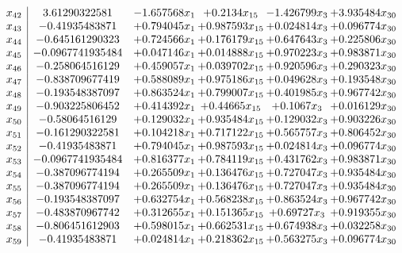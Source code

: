\documentclass[11pt]{article}
\begin{document}
\[\begin{array}{c| c c@{\hskip 2pt} c@{\hskip 2pt} c@{\hskip 2pt} c@{\hskip 2pt} }
 x_{42}   &  3.61290322581 & -1.657568 x_{1} & + 0.2134 x_{15} & -1.426799 x_{3} & + 3.935484 x_{30}\\
 x_{43}   &  -0.41935483871 & + 0.794045 x_{1} & + 0.987593 x_{15} & + 0.024814 x_{3} & + 0.096774 x_{30}\\
 x_{44}   &  -0.645161290323 & + 0.724566 x_{1} & + 0.176179 x_{15} & + 0.647643 x_{3} & + 0.225806 x_{30}\\
 x_{45}   &  -0.0967741935484 & + 0.047146 x_{1} & + 0.014888 x_{15} & + 0.970223 x_{3} & + 0.983871 x_{30}\\
 x_{46}   &  -0.258064516129 & + 0.459057 x_{1} & + 0.039702 x_{15} & + 0.920596 x_{3} & + 0.290323 x_{30}\\
 x_{47}   &  -0.838709677419 & + 0.588089 x_{1} & + 0.975186 x_{15} & + 0.049628 x_{3} & + 0.193548 x_{30}\\
 x_{48}   &  -0.193548387097 & + 0.863524 x_{1} & + 0.799007 x_{15} & + 0.401985 x_{3} & + 0.967742 x_{30}\\
 x_{49}   &  -0.903225806452 & + 0.414392 x_{1} & + 0.44665 x_{15} & + 0.1067 x_{3} & + 0.016129 x_{30}\\
 x_{50}   &  -0.58064516129 & + 0.129032 x_{1} & + 0.935484 x_{15} & + 0.129032 x_{3} & + 0.903226 x_{30}\\
 x_{51}   &  -0.161290322581 & + 0.104218 x_{1} & + 0.717122 x_{15} & + 0.565757 x_{3} & + 0.806452 x_{30}\\
 x_{52}   &  -0.41935483871 & + 0.794045 x_{1} & + 0.987593 x_{15} & + 0.024814 x_{3} & + 0.096774 x_{30}\\
 x_{53}   &  -0.0967741935484 & + 0.816377 x_{1} & + 0.784119 x_{15} & + 0.431762 x_{3} & + 0.983871 x_{30}\\
 x_{54}   &  -0.387096774194 & + 0.265509 x_{1} & + 0.136476 x_{15} & + 0.727047 x_{3} & + 0.935484 x_{30}\\
 x_{55}   &  -0.387096774194 & + 0.265509 x_{1} & + 0.136476 x_{15} & + 0.727047 x_{3} & + 0.935484 x_{30}\\
 x_{56}   &  -0.193548387097 & + 0.632754 x_{1} & + 0.568238 x_{15} & + 0.863524 x_{3} & + 0.967742 x_{30}\\
 x_{57}   &  -0.483870967742 & + 0.312655 x_{1} & + 0.151365 x_{15} & + 0.69727 x_{3} & + 0.919355 x_{30}\\
 x_{58}   &  -0.806451612903 & + 0.598015 x_{1} & + 0.662531 x_{15} & + 0.674938 x_{3} & + 0.032258 x_{30}\\
 x_{59}   &  -0.41935483871 & + 0.024814 x_{1} & + 0.218362 x_{15} & + 0.563275 x_{3} & + 0.096774 x_{30}\\

\end{array}\]
\end{document}
